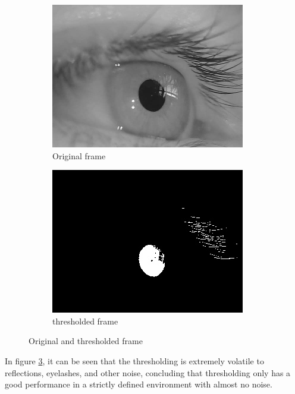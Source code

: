 \begin{figure}[ht]
    \centering
    \begin{subfigure}{.5\textwidth}
      \centering
      \includegraphics[width=.9\linewidth]{plots/orig_canny.png}
      \caption{Original frame}
      \label{fig:th_orig}
    \end{subfigure}%
    \begin{subfigure}{.5\textwidth}
      \centering
      \includegraphics[width=.9\linewidth]{plots/thresholded.jpg}
      \caption{thresholded frame}
      \label{fig:th_thres}
    \end{subfigure}
    \caption{Original and thresholded frame}
    \label{fig:simple_thresh}
\end{figure}
In figure \ref{fig:simple_thresh}, it can be seen that the thresholding is extremely volatile to reflections, eyelashes, and other noise, concluding that thresholding only has a good performance in a strictly defined environment with almost no noise. 

